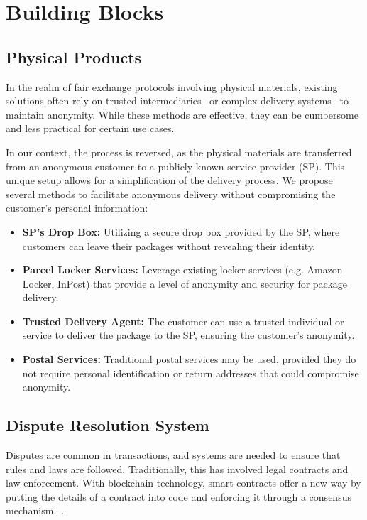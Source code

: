 \documentclass[pdftex,twocolumn,epjc3]{svjour3}
\begin{document}
\section{Building Blocks}\label{sec:building-blocks}

\subsection{Physical Products}\label{sec:physical-products}
In the realm of fair exchange protocols involving physical materials, existing solutions often rely on trusted intermediaries~\cite{mohammedalarajFairnessPhysicalProducts2012, birjoveanuAnonymityFairexchangeEcommerce2015} or complex delivery systems~\cite{altawyLelantosBlockchainBasedAnonymous2017} to maintain anonymity. While these methods are effective, they can be cumbersome and less practical for certain use cases.

In our context, the process is reversed, as the physical materials are transferred from an anonymous customer to a publicly known service provider (SP). This unique setup allows for a simplification of the delivery process. We propose several methods to facilitate anonymous delivery without compromising the customer's personal information:

\begin{itemize}
    \item \textbf{SP's Drop Box:} Utilizing a secure drop box provided by the SP, where customers can leave their packages without revealing their identity.
    
    \item \textbf{Parcel Locker Services:} Leverage existing locker services (e.g. Amazon Locker, InPost) that provide a level of anonymity and security for package delivery.
    
    \item \textbf{Trusted Delivery Agent:} The customer can use a trusted individual or service to deliver the package to the SP, ensuring the customer's anonymity.
    
    \item \textbf{Postal Services:} Traditional postal services may be used, provided they do not require personal identification or return addresses that could compromise anonymity.
\end{itemize}

\subsection{Dispute Resolution System}
\label{sec:dispute-resolution}
\begin{sloppypar}
Disputes are common in transactions, and systems are needed to ensure that rules and laws are followed. Traditionally, this has involved legal contracts and law enforcement. With blockchain technology, smart contracts offer a new way by putting the details of a contract into code and enforcing it through a consensus mechanism.~\cite{allenGovernanceBlockchainDispute2019,lingwallShouldCodeBe2019}.
\end{sloppypar}
\end{document}
